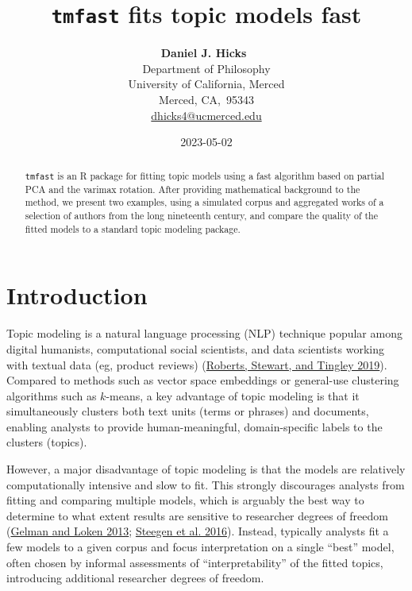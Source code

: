 \documentclass[
]{article}
\title{\texttt{tmfast} fits topic models fast}
\author{
\textbf{Daniel J. Hicks}~\orcidlink{0000-0001-7945-4416}\\Department of
Philosophy\\University of California, Merced\\Merced,
CA,\ 95343\\\href{mailto:dhicks4@ucmerced.edu}{dhicks4@ucmerced.edu}}
\date{2023-05-02}
\renewcommand*\contentsname{Table of contents}
\newcommand\contentsname{Table of contents}
\begin{document}
\maketitle
\begin{abstract}
\texttt{tmfast} is an R package for fitting topic models using a fast
algorithm based on partial PCA and the varimax rotation. After providing
mathematical background to the method, we present two examples, using a
simulated corpus and aggregated works of a selection of authors from the
long nineteenth century, and compare the quality of the fitted models to
a standard topic modeling package.
\end{abstract}
\ifdefined\Shaded\renewenvironment{Shaded}{\begin{tcolorbox}[breakable, enhanced, colback={shadecolor}, boxrule=0pt, frame hidden]}{\end{tcolorbox}}\fi

\renewcommand*\contentsname{Table of contents}
{
\hypersetup{linkcolor=}
\setcounter{tocdepth}{3}
\tableofcontents
}
\hypertarget{introduction}{%
\section{Introduction}\label{introduction}}

Topic modeling is a natural language processing (NLP) technique popular
among digital humanists, computational social scientists, and data
scientists working with textual data (eg, product reviews)
(\protect\hyperlink{ref-RobertsStmPackageStructural2019}{Roberts,
Stewart, and Tingley 2019}). Compared to methods such as vector space
embeddings or general-use clustering algorithms such as \(k\)-means, a
key advantage of topic modeling is that it simultaneously clusters both
text units (terms or phrases) and documents, enabling analysts to
provide human-meaningful, domain-specific labels to the clusters
(topics).

However, a major disadvantage of topic modeling is that the models are
relatively computationally intensive and slow to fit. This strongly
discourages analysts from fitting and comparing multiple models, which
is arguably the best way to determine to what extent results are
sensitive to researcher degrees of freedom
(\protect\hyperlink{ref-GelmanGardenForkingPaths2013}{Gelman and Loken
2013};
\protect\hyperlink{ref-SteegenIncreasingTransparencyMultiverse2016}{Steegen
et al. 2016}). Instead, typically analysts fit a few models to a given
corpus and focus interpretation on a single ``best'' model, often chosen
by informal assessments of ``interpretability'' of the fitted topics,
introducing additional researcher degrees of freedom.
\end{document}
